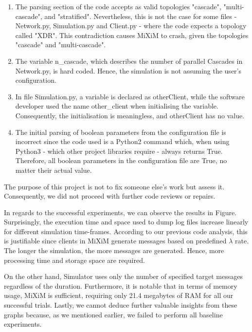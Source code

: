 \documentclass[logo,msc,cyber]{infthesis}   %
\begin{document}
\begin{enumerate}
    \item The parsing section of the code accepts as valid topologies "cascade",
    "multi-cascade", and "stratified". Nevertheless, this is not the case for
    some files - Network.py, Simulation.py and Client.py - where the code
    expects a topology called "XDR". This contradiction causes MiXiM to crash,
    given the topologies "cascade" and "multi-cascade". 
    \item The variable n\_cascade, which describes the number of parallel
    Cascades in Network.py, is hard coded. Hence, the simulation is not assuming
    the user's configuration.
    \item In file Simulation.py, a variable is declared as otherClient, while
    the software developer used the name other\_client when initialising the
    variable. Consequently, the initialisation is meaningless, and otherClient
    has no value.
    \item The initial parsing of boolean parameters from the configuration file
    is incorrect since the code used is a Python2 command which, when using
    Python3 - which other project libraries require - always returns True.
    Therefore, all boolean parameters in the configuration file are True, no
    matter their actual value.
\end{enumerate}

The purpose of this project is not to fix someone else's work but assess
it. Consequently, we did not proceed with further code reviews or repairs.

In regards to the successful experiments, we can observe the results in Figure.
Surprisingly, the execution time and space used to dump log files increase
linearly for different simulation time-frames. According to our previous code
analysis, this is justifiable since clients in MiXiM generate messages based on
predefined $\lambda$ rate. The longer the simulation, the more messages are generated. Hence,
more processing time and storage space are required.

On the other hand, Simulator uses only the number of specified target messages
regardless of the duration. Furthermore, it is notable that in terms of memory
usage, MiXiM is sufficient, requiring only 21.4 megabytes of RAM for all our
successful trials. Lastly, we cannot deduce further valuable insights from these
graphs because, as we mentioned earlier, we failed to perform all baseline
experiments.
\end{document}
